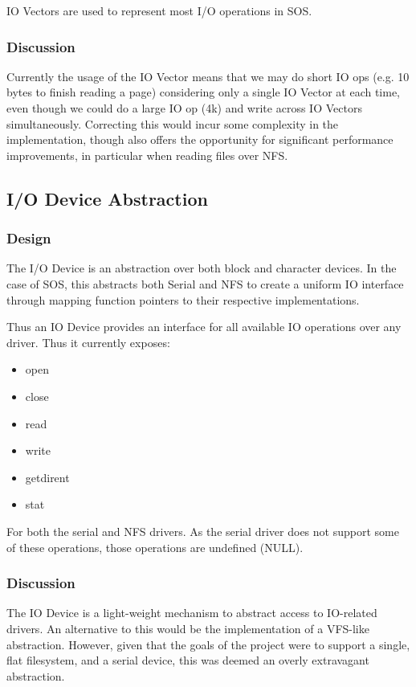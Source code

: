 \documentclass[a4paper,12pt]{article}
\begin{document}
IO Vectors are used to represent most I/O operations in SOS.

\subsubsection{Discussion}
Currently the usage of the IO Vector means that we may do short IO ops
(e.g. 10 bytes to finish reading a page) considering only a single IO Vector
at each time, even though we could do a large IO op (4k) and write across IO
Vectors simultaneously.  Correcting this would incur some complexity in the
implementation, though also offers the opportunity for significant performance
improvements, in particular when reading files over NFS.

\subsection{I/O Device Abstraction}
\subsubsection{Design}
The I/O Device is an abstraction over both block and character devices.  In
the case of SOS, this abstracts both Serial and NFS to create a uniform IO
interface through mapping function pointers to their respective
implementations.

Thus an IO Device provides an interface for all available IO operations over
any driver.  Thus it currently exposes:

\begin{itemize}
\item open
\item close
\item read
\item write
\item getdirent
\item stat
\end{itemize}

For both the serial and NFS drivers.  As the serial driver does not support
some of these operations, those operations are undefined (NULL).

\subsubsection{Discussion}
The IO Device is a light-weight mechanism to abstract access to IO-related
drivers.  An alternative to this would be the implementation of a VFS-like
abstraction.  However, given that the goals of the project were to support a
single, flat filesystem, and a serial device, this was deemed an overly
extravagant abstraction.
\end{document}
